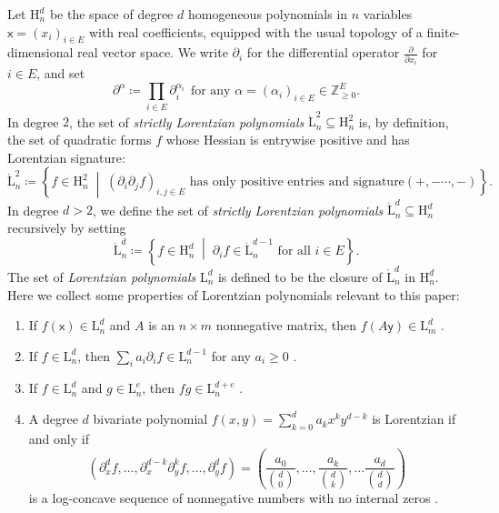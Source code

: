 \documentclass{amsart}
\theoremstyle{definition}
\theoremstyle{remark}
\newcommand{\set}[1]{\left\{#1\right\}}             %
\newcommand{\Z}{\mathbb{Z}}
\newcommand{\x}{\mathsf{x}}    %
\newcommand{\y}{\mathsf{y}}    %
\newcommand{\1}{\mathbf{1}}
\newcommand{\HH}{\mathrm{H}}
\newcommand{\LL}{\mathrm{L}}
\def\strL{\mathring{\mathrm{L}}}
\numberwithin{equation}{section}
\begin{document}
Let $\HH^d_n$ be the space of degree $d$ homogeneous polynomials in $n$
variables $\x=(x_i)_{i \in E}$ with real coefficients, equipped with the usual topology of a finite-dimensional real vector space. 
We write $\partial_i$ for the differential operator $\frac{\partial}{\partial x_i}$ for $i\in E$, and set
\[
\partial^\alpha \coloneqq \prod_{i\in E} \partial_i^{\alpha_i}  \ \ \text{for any $\alpha=(\alpha_i)_{i \in E}\in \Z^E_{\geq 0}$}.
\]
In degree $2$, the set of \emph{strictly Lorentzian polynomials} $\strL_n^2\subseteq \HH^2_n$
is, by definition, the set of quadratic forms $f$ whose Hessian is entrywise positive and has 
Lorentzian signature: 
\[
\strL^2_n \coloneqq \set{f\in \HH^2_n  \;\middle|\; \left(\partial_i \partial_j f\right)_{i,j \in E} \text{~has only positive entries and  signature}  (+, - \cdots, -)}.
\]
 In degree $d>2$, we
define the set of \emph{strictly Lorentzian polynomials} $\strL_n^d\subseteq \HH^d_n$ recursively by setting
\[
\strL^d_n \coloneqq \set{f\in \HH^d_n  \;\middle|\;  \partial_i f\in \strL_n^{d-1}\text{~for all
    $i \in E$}}.
\]
The set of  \emph{Lorentzian polynomials} $\LL_n^d$
is defined to be the closure of $\strL_n^d$ in $\HH^d_n$. 
Here we collect some properties of Lorentzian polynomials relevant to this paper: 

\begin{enumerate}[(1)]\itemsep 5pt
    \item If $f(\x)\in \LL^d_n$ and $A$ is an $n\times m$ nonnegative matrix, then $f(A\y) \in \LL^d_m$ \cite[Theorem 2.10]{BH20}.
    \item If $f\in \LL_n^d$, then $\sum_i a_i \partial_i f \in \LL_n^{d-1}$ for any $a_i \ge 0$ \cite[Corollary 2.11]{BH20}.
    \item If $f\in \LL_n^d$ and $g\in \LL_n^e$, then $fg\in \LL^{d+e}_n$ \cite[Corollary 2.32]{BH20}.
    \item A degree $d$ bivariate polynomial $f(x,y) =  \sum\limits_{k=0}^d a_k x^ky^{d-k}$ 
is Lorentzian if and only if 
\[
(\partial_x^d f, \ldots,\partial_x^{d-k}\partial_y^{k}f,\ldots,\partial_y^d f) = 
\left(\frac{a_0}{\binom{d}{0}}, \ldots, \frac{a_k}{\binom{d}{k}}, \ldots \frac{a_d}{\binom{d}{d}}\right)
\]
is a log-concave sequence of nonnegative numbers with no internal zeros \cite[Example 2.3]{BH20}. 
\end{enumerate}
\end{document}
